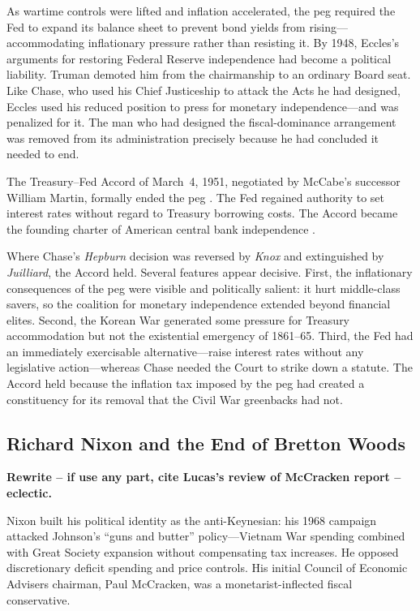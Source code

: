 \documentclass[12pt]{article}
\begin{document}
As wartime controls were lifted and inflation accelerated, the peg
required the Fed to expand its balance sheet to prevent bond yields
from rising---accommodating inflationary pressure rather than resisting
it.  By 1948, Eccles's arguments for restoring Federal Reserve
independence had become a political liability.  Truman demoted him from
the chairmanship to an ordinary Board seat.  Like Chase, who used his
Chief Justiceship to attack the Acts he had designed, Eccles used his
reduced position to press for monetary independence---and was penalized
for it.  The man who had designed the fiscal-dominance arrangement was
removed from its administration precisely because he had concluded it
needed to end.

The Treasury--Fed Accord of March~4, 1951, negotiated by McCabe's
successor William Martin, formally ended the peg \citep{HetzelLeach2001}.
The Fed regained authority to set interest rates without regard to
Treasury borrowing costs.  The Accord became the founding charter of
American central bank independence \citep{Meltzer2003}.

Where Chase's \textit{Hepburn} decision was reversed by \textit{Knox}
and extinguished by \textit{Juilliard}, the Accord held.  Several
features appear decisive.  First, the inflationary consequences of the
peg were visible and politically salient: it hurt middle-class savers,
so the coalition for monetary independence extended beyond financial
elites.  Second, the Korean War generated some pressure for Treasury
accommodation but not the existential emergency of 1861--65.  Third,
the Fed had an immediately exercisable alternative---raise interest
rates without any legislative action---whereas Chase needed the Court to
strike down a statute.  The Accord held because the inflation tax imposed
by the peg had created a constituency for its removal that the Civil War
greenbacks had not.

\subsection{Richard Nixon and the End of Bretton Woods}

\textbf{Rewrite -- if use any part, cite Lucas's review of McCracken report -- eclectic.}



Nixon built his political identity as the anti-Keynesian: his 1968
campaign attacked Johnson's ``guns and butter'' policy---Vietnam War
spending combined with Great Society expansion without compensating tax
increases.  He opposed discretionary deficit spending and price controls.
His initial Council of Economic Advisers chairman, Paul McCracken, was a
monetarist-inflected fiscal conservative.
\end{document}
